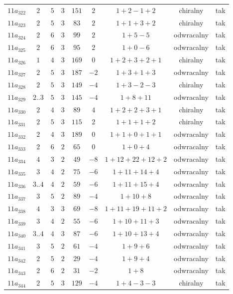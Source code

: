 \begin{longtable}{ccccccccc}
$11a_{322}$ & $2$ & $5$ & $3$ & $151$ & $2$ & $1+2-1+2$ & chiralny & tak \\
$11a_{323}$ & $2$ & $5$ & $3$ & $83$ & $2$ & $1+1+3+2$ & chiralny & tak \\
$11a_{324}$ & $2$ & $6$ & $3$ & $99$ & $2$ & $1+5-5$ & odwracalny & tak \\
$11a_{325}$ & $2$ & $6$ & $3$ & $95$ & $2$ & $1+0-6$ & odwracalny & tak \\
$11a_{326}$ & $1$ & $4$ & $3$ & $169$ & $0$ & $1+2+3+2+1$ & chiralny & tak \\
$11a_{327}$ & $2$ & $5$ & $3$ & $187$ & $-2$ & $1+3+1+3$ & odwracalny & tak \\
$11a_{328}$ & $2$ & $5$ & $3$ & $149$ & $-4$ & $1+3-2-3$ & chiralny & tak \\
$11a_{329}$ & $2..3$ & $5$ & $3$ & $145$ & $-4$ & $1+8+11$ & odwracalny & tak \\
$11a_{330}$ & $2$ & $4$ & $3$ & $89$ & $4$ & $1+2+2+3+1$ & chiralny & tak \\
$11a_{331}$ & $2$ & $5$ & $3$ & $115$ & $2$ & $1+1+1+2$ & chiralny & tak \\
$11a_{332}$ & $2$ & $4$ & $3$ & $189$ & $0$ & $1+1+0+1+1$ & odwracalny & tak \\
$11a_{333}$ & $2$ & $6$ & $2$ & $65$ & $0$ & $1+0+4$ & odwracalny & tak \\
$11a_{334}$ & $4$ & $3$ & $2$ & $49$ & $-8$ & $1+12+22+12+2$ & odwracalny & tak \\
$11a_{335}$ & $3$ & $4$ & $2$ & $75$ & $-6$ & $1+11+14+4$ & odwracalny & tak \\
$11a_{336}$ & $3..4$ & $4$ & $2$ & $59$ & $-6$ & $1+11+15+4$ & odwracalny & tak \\
$11a_{337}$ & $3$ & $5$ & $2$ & $89$ & $-4$ & $1+10+8$ & odwracalny & tak \\
$11a_{338}$ & $4$ & $3$ & $3$ & $69$ & $-8$ & $1+11+19+11+2$ & odwracalny & tak \\
$11a_{339}$ & $3$ & $4$ & $2$ & $55$ & $-6$ & $1+10+11+3$ & odwracalny & tak \\
$11a_{340}$ & $3..4$ & $4$ & $3$ & $87$ & $-6$ & $1+10+13+4$ & odwracalny & tak \\
$11a_{341}$ & $3$ & $5$ & $2$ & $61$ & $-4$ & $1+9+6$ & odwracalny & tak \\
$11a_{342}$ & $2$ & $5$ & $2$ & $29$ & $-4$ & $1+9+4$ & odwracalny & tak \\
$11a_{343}$ & $2$ & $6$ & $2$ & $31$ & $-2$ & $1+8$ & odwracalny & tak \\
$11a_{344}$ & $2$ & $5$ & $3$ & $129$ & $-4$ & $1+4-3-3$ & chiralny & tak \\

\end{longtable}
